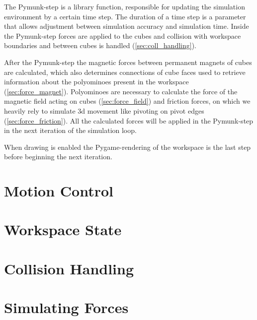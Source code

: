 The Pymunk-step is a library function, responsible for updating the simulation environment by a certain time step.
The duration of a time step is a parameter that allows adjustment between simulation accuracy and simulation time. 
Inside the Pymunk-step forces are applied to the cubes and collision with workspace boundaries and between cubes is handled (\autoref{sec:coll_handling}).

After the Pymunk-step the magnetic forces between permanent magnets of cubes are calculated, which also determines connections of cube faces used to retrieve information about the polyominoes present in the workspace (\autoref{sec:force_magnet}).
Polyominoes are necessary to calculate the force of the magnetic field acting on cubes (\autoref{sec:force_field}) and friction forces, on which we heavily rely to simulate 3d movement like pivoting on pivot edges (\autoref{sec:force_friction}).
All the calculated forces will be applied in the Pymunk-step in the next iteration of the simulation loop.

When drawing is enabled the Pygame-rendering of the workspace is the last step before beginning the next iteration.



\section{Motion Control}
\label{sec:motion_control}


\section{Workspace State}
\label{sec:workspace_state}


\section{Collision Handling}
\label{sec:coll_handling}

\section{Simulating Forces}

